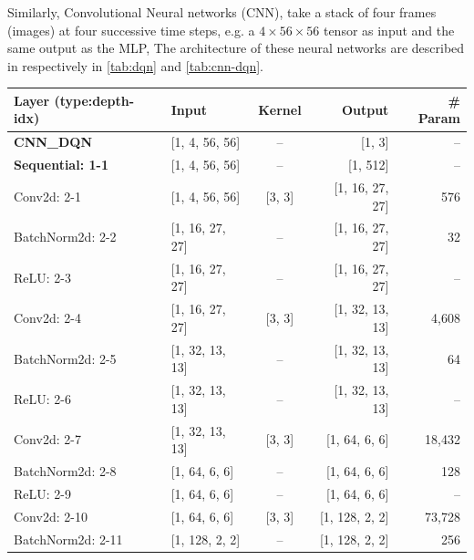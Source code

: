 Similarly, Convolutional Neural networks (CNN), take a stack of four frames (images) at four successive time steps, e.g. a $4\times56\times56$ tensor as input and the same output as the MLP, The architecture of these neural networks are described in respectively in \ref{tab:dqn} and \ref{tab:cnn-dqn}.

\begin{table}
	\centering
	\begin{adjustbox}{max width=\linewidth}
		\begin{tabular}{@{}llcrr@{}}
			\toprule
			Layer (type:depth-idx) & Input& Kernel& Output & \# Param \\
			\midrule
			\textbf{CNN\_DQN}                                   & [1, 4, 56, 56]   & --            & [1, 3]           & --     \\
			\quad \textbf{Sequential: 1-1}                   & [1, 4, 56, 56]   & --            & [1, 512]         & --     \\
			\quad \quad Conv2d: 2-1                  & [1, 4, 56, 56]   & [3, 3]        & [1, 16, 27, 27]  & 576    \\
			\quad \quad BatchNorm2d: 2-2             & [1, 16, 27, 27]  & --            & [1, 16, 27, 27]  & 32     \\
			\quad \quad ReLU: 2-3                    & [1, 16, 27, 27]  & --            & [1, 16, 27, 27]  & --     \\
			\quad \quad Conv2d: 2-4                  & [1, 16, 27, 27]  & [3, 3]        & [1, 32, 13, 13]  & 4,608  \\
			\quad \quad BatchNorm2d: 2-5             & [1, 32, 13, 13]  & --            & [1, 32, 13, 13]  & 64     \\
			\quad \quad ReLU: 2-6                    & [1, 32, 13, 13]  & --            & [1, 32, 13, 13]  & --     \\
			\quad \quad Conv2d: 2-7                  & [1, 32, 13, 13]  & [3, 3]        & [1, 64, 6, 6]    & 18,432 \\
			\quad \quad BatchNorm2d: 2-8             & [1, 64, 6, 6]    & --            & [1, 64, 6, 6]    & 128    \\
			\quad \quad ReLU: 2-9                    & [1, 64, 6, 6]    & --            & [1, 64, 6, 6]    & --     \\
			\quad \quad Conv2d: 2-10                 & [1, 64, 6, 6]    & [3, 3]        & [1, 128, 2, 2]   & 73,728 \\
			\quad \quad BatchNorm2d: 2-11            & [1, 128, 2, 2]   & --            & [1, 128, 2, 2]   & 256    \\

\end{tabular}
\end{adjustbox}
\end{table}

